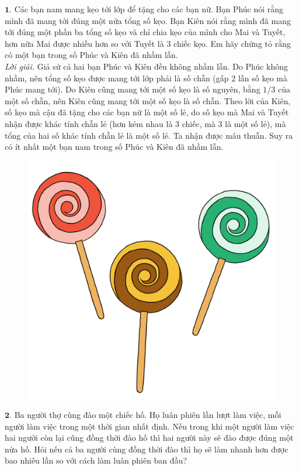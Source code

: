 \begin{multicols}{2}
	$\pmb{1.}$ Các bạn nam mang kẹo tới lớp để tặng cho các bạn nữ. Bạn Phúc nói rằng mình đã mang tới đúng một nửa tổng số kẹo. Bạn Kiên nói rằng mình đã mang tới đúng một phần ba tổng số kẹo và chỉ chia kẹo của mình cho Mai và Tuyết, hơn nữa Mai được nhiều hơn so với Tuyết là $3$ chiếc kẹo. Em hãy chứng tỏ rằng có một bạn trong số Phúc và Kiên đã \linebreak nhầm lẫn.\\
	\textit{Lời giải.} Giả sử cả hai bạn Phúc và Kiên đều không nhầm lẫn. Do Phúc không nhầm, nên tổng số kẹo được mang tới lớp phải là số chẵn (gấp $2$ lần số kẹo mà Phúc mang tới). Do Kiên cũng mang tới một số kẹo là số nguyên, bằng $1/3$ của một số chẵn, nên Kiên cũng mang tới một số kẹo là số chẵn. Theo lời của Kiên, số kẹo mà cậu đã tặng cho các bạn nữ là một số lẻ, do số kẹo mà Mai và Tuyết nhận được khác tính chẵn lẻ (hơn kém nhau là $3$ chiếc, mà $3$ là một số lẻ), mà tổng của hai số khác tính chẵn lẻ là một số lẻ. Ta nhận được mâu thuẫn. Suy ra có ít nhất một bạn nam trong số Phúc và Kiên đã nhầm lẫn.
	\begin{figure}[H]
			\centering
		\vspace*{-5pt}
		\captionsetup{labelformat= empty, justification=centering}
		\includegraphics[width=0.6\linewidth]{Pi7_bai1}
		\vspace*{-10pt}
	\end{figure}
	$\pmb{2.}$ Ba người thợ cùng đào một chiếc hố. Họ luân phiên lần lượt làm việc, mỗi người làm việc trong một thời gian nhất định. Nếu trong khi một người làm việc hai người còn lại cũng đồng thời đào hố thì hai người này sẽ đào được đúng một nửa hố. Hỏi nếu cả ba người cùng đồng thời đào thì họ sẽ làm nhanh hơn được bao nhiêu lần so với cách làm luân phiên ban đầu?
	\begin{figure}[H]

\end{figure}
\end{multicols}
